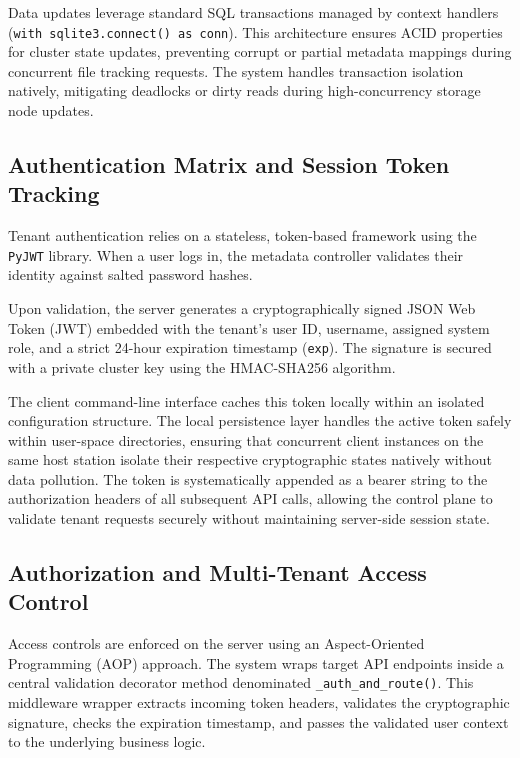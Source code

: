 Data updates leverage standard SQL transactions managed by context handlers (\texttt{with sqlite3.connect() as conn}). This architecture ensures ACID properties for cluster state updates, preventing corrupt or partial metadata mappings during concurrent file tracking requests. The system handles transaction isolation natively, mitigating deadlocks or dirty reads during high-concurrency storage node updates.

\subsection{Authentication Matrix and Session Token Tracking}
Tenant authentication relies on a stateless, token-based framework using the \texttt{PyJWT} library. When a user logs in, the metadata controller validates their identity against salted password hashes. 

Upon validation, the server generates a cryptographically signed JSON Web Token (JWT) embedded with the tenant's user ID, username, assigned system role, and a strict 24-hour expiration timestamp (\texttt{exp}). The signature is secured with a private cluster key using the HMAC-SHA256 algorithm. 

The client command-line interface caches this token locally within an isolated configuration structure. The local persistence layer handles the active token safely within user-space directories, ensuring that concurrent client instances on the same host station isolate their respective cryptographic states natively without data pollution. The token is systematically appended as a bearer string to the authorization headers of all subsequent API calls, allowing the control plane to validate tenant requests securely without maintaining server-side session state.

\subsection{Authorization and Multi-Tenant Access Control}
Access controls are enforced on the server using an Aspect-Oriented Programming (AOP) approach. The system wraps target API endpoints inside a central validation decorator method denominated \texttt{\_auth\_and\_route()}. This middleware wrapper extracts incoming token headers, validates the cryptographic signature, checks the expiration timestamp, and passes the validated user context to the underlying business logic. 

